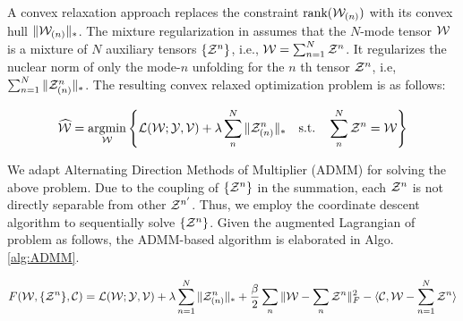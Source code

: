 
A convex relaxation approach replaces the constraint $\text{rank}({\mathcal W}_{(n)})$ with its convex hull $\|{\mathcal W}_{(n)}\|_*$.  The mixture regularization in \cite{tomioka2010estimation} assumes that the $N$-mode tensor ${\mathcal W}$ is a mixture of $N$ auxiliary tensors $\{{\mathcal Z}^{n}\}$, i.e., ${\mathcal W} = \sum_{n=1}^{N}{\mathcal Z}^n$. It regularizes the nuclear norm of only the mode-$n$ unfolding for the $n$ th tensor ${\mathcal Z}^{n}$, i.e, $\sum_{n=1}^N \|{\mathcal Z}^n_{(n)}\|_*$. The resulting convex relaxed optimization problem is as follows:

\vspace{-0.3in}
\begin{align}\label{eqn:mixture}
\widehat{{\mathcal W}} = \operatorname*{argmin}_{{\mathcal W}}\left\{\mathcal{L}({\mathcal W};{\mathcal Y}, {\mathcal V} )   + \lambda \sum_n^N \|{\mathcal Z}^n_{(n)}\|_*  \quad
\mathrm{s.t.} \quad  \sum\limits_n^N {\mathcal Z}^n = {\mathcal W}\right\}
\end{align} 
\vspace{-0.1in}


We adapt Alternating Direction Methods of Multiplier  (ADMM) \cite{gabay1976dual} for solving the above problem. Due to the coupling of $\{ {\mathcal Z}^n \}$ in the summation, each ${\mathcal Z}^n$ is not directly separable from other ${\mathcal Z}^{n'}$. Thus, we employ the coordinate descent algorithm to sequentially solve $\{{\mathcal Z}^n\}$. Given the augmented Lagrangian of problem as follows, the ADMM-based algorithm is elaborated in Algo. \ref{alg:ADMM}. 

\begin{eqnarray}\label{eqn:AL}
F(\mathcal{{\mathcal W}},\{\mathcal{Z}^n\},\mathcal{C}) =  \mathcal{L}({\mathcal W};{\mathcal Y}, {\mathcal V} )  + \lambda \sum\limits_{n=1}^N\|\mathcal{Z}^n_{(n)}\|_*  +  \frac{\beta}{2}\sum\limits_n \|\mathcal{{\mathcal W}}-\sum\limits_n\mathcal{Z}^n \|_F^2   -  \langle\mathcal{C}, \mathcal{{\mathcal W}}-\sum\limits_{n=1}^N\mathcal{Z}^n\rangle
\end{eqnarray}


%   

